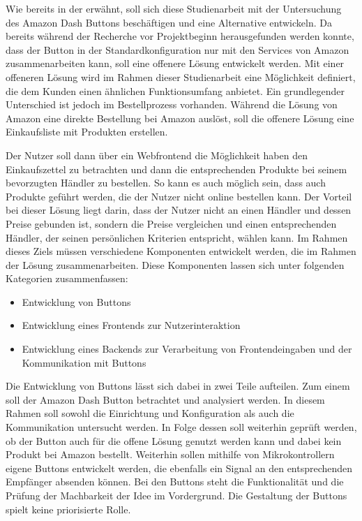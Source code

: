 Wie bereits in der  erwähnt, soll sich diese Studienarbeit mit der Untersuchung des Amazon Dash Buttons beschäftigen und eine Alternative entwickeln. Da bereits während der Recherche vor Projektbeginn herausgefunden werden konnte, dass der Button in der Standardkonfiguration nur mit den Services von Amazon zusammenarbeiten kann, soll eine offenere Lösung entwickelt werden. Mit einer offeneren Lösung wird im Rahmen dieser Studienarbeit eine Möglichkeit definiert, die dem Kunden einen ähnlichen Funktionsumfang anbietet. Ein grundlegender Unterschied ist jedoch im Bestellprozess vorhanden. Während die Lösung von Amazon eine direkte Bestellung bei Amazon auslöst, soll die offenere Lösung eine Einkaufsliste mit Produkten erstellen. 

Der Nutzer soll dann über ein Webfrontend die Möglichkeit haben den Einkaufszettel zu betrachten und dann die entsprechenden Produkte bei seinem bevorzugten Händler zu bestellen. So kann es auch möglich sein, dass auch Produkte geführt werden, die der Nutzer nicht online bestellen kann. Der Vorteil bei dieser Lösung liegt darin, dass der Nutzer nicht an einen Händler und dessen Preise gebunden ist, sondern die Preise vergleichen und einen entsprechenden Händler, der seinen persönlichen Kriterien entspricht, wählen kann. 
Im Rahmen dieses Ziels müssen verschiedene Komponenten entwickelt werden, die im Rahmen der Lösung zusammenarbeiten. Diese Komponenten lassen sich unter folgenden Kategorien zusammenfassen:
\begin{itemize}
\item Entwicklung von Buttons 
\item Entwicklung eines Frontends zur Nutzerinteraktion
\item Entwicklung eines Backends zur Verarbeitung von Frontendeingaben und der Kommunikation mit Buttons 
\end{itemize}
Die Entwicklung von Buttons lässt sich dabei in zwei Teile aufteilen. Zum einem soll der Amazon Dash Button betrachtet und analysiert werden. In diesem Rahmen soll sowohl die Einrichtung und Konfiguration als auch die Kommunikation untersucht werden. In Folge dessen soll weiterhin geprüft werden, ob der Button auch für die offene Lösung genutzt werden kann und dabei kein Produkt bei Amazon bestellt. Weiterhin sollen mithilfe von Mikrokontrollern eigene Buttons entwickelt werden, die ebenfalls ein Signal an den entsprechenden Empfänger absenden können. Bei den Buttons steht die Funktionalität und die Prüfung der Machbarkeit der Idee im Vordergrund. Die Gestaltung der Buttons spielt keine priorisierte Rolle. 

